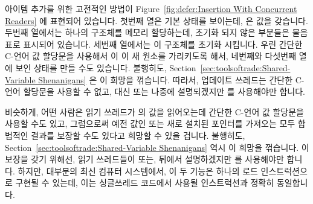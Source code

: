 아이템 추가를 위한 고전적인 방법이
Figure~\ref{fig:defer:Insertion With Concurrent Readers} 에 표현되어 있습니다.
첫번째 열은 기본 상태를 보이는데,  은  값을 갖습니다.
두번째 열에서는 하나의 구조체를 메모리 할당하는데, 초기화 되지 않은 부분들은
물음표로 표시되어 있습니다.
세번째 열에서는 이 구조체를 초기화 시킵니다.
우린 간단한 C-언어 값 할당문을 사용해서  이 이 새 원소를 가리키도록
해서, 네번째와 다섯번째 열에 보인 상태를 만들 수도 있습니다.
불행히도, Section~\ref{sec:toolsoftrade:Shared-Variable Shenanigans} 은 이
희망을 꺾습니다.
따라서, 업데이트 쓰레드는 간단한 C-언어 할당문을 사용할 수 없고, 대신
 또는 나중에 설명되겠지만  를
사용해야만 합니다.

비슷하게, 어떤 사람은 읽기 쓰레드가  의 값을 읽어오는데 간단한 C-언어
값 할당문을 사용할 수도 있고, 그럼으로써 예전 값인  또는 새로 설치된
포인터를 가져오는 모두 합법적인 결과를 보장할 수도 있다고 희망할 수 있을
겁니다.
불행히도, Section~\ref{sec:toolsoftrade:Shared-Variable Shenanigans} 역시 이
희망을 꺾습니다.
이 보장을 갖기 위해선, 읽기 쓰레드들이  또는, 뒤에서
설명하겠지만  를 사용해야만 합니다.
하지만, 대부분의 최신 컴퓨터 시스템에서, 이 두 기능은 하나의 로드
인스트럭션으로 구현될 수 있는데, 이는 싱글쓰레드 코드에서 사용될 인스트럭션과
정확히 동일합니다.

